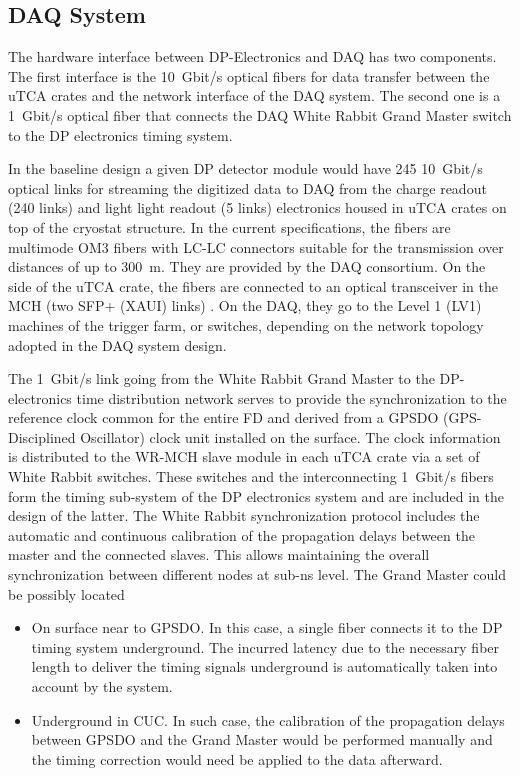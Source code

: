 \subsection{DAQ System}
\label{sec:fddp-tpc-elec-intfc-daq}

The hardware interface between DP-Electronics and DAQ has two components. The first interface is the \SI{10}{Gbit/s} optical fibers for data transfer between the uTCA crates and the network interface of the DAQ system. The second one is a \SI{1}{Gbit/s} optical fiber that connects the DAQ White Rabbit Grand Master switch to the DP electronics timing system.   

In the baseline design a given DP detector module would have \num{245} \SI{10}{Gbit/s} optical links for streaming the digitized data to DAQ from the charge readout (\num{240} links) and light light readout (\num{5} links) electronics housed in uTCA crates on top of the cryostat structure.  In the current specifications, the fibers are multimode OM3 fibers \cite{om3fibers} with LC-LC connectors suitable for the transmission over distances of up to \SI{300}{\metre}.  They are provided by the DAQ consortium. On the side of the uTCA crate, the fibers are connected to an optical transceiver in the MCH (two SFP+ (XAUI) links) \cite{natmch}.  On the DAQ, they go to the Level 1 (LV1) machines of the trigger farm, or switches, depending on the network topology adopted in the DAQ system design.

The \SI{1}{Gbit/s} link going from the White Rabbit Grand Master to the DP-electronics time distribution network serves to provide the synchronization to the reference clock common for the entire FD and derived from a GPSDO (GPS-Disciplined Oscillator) clock unit installed on the surface. The clock information is distributed to the WR-MCH slave module in each uTCA crate via a set of White Rabbit switches. These switches and the interconnecting \SI{1}{Gbit/s} fibers form the timing sub-system of the DP electronics system and are included in the design of the latter. The White Rabbit synchronization protocol includes the automatic and continuous calibration of the propagation delays between the master and the connected slaves. This allows maintaining the overall synchronization between different nodes at sub-ns level. The Grand Master could be possibly located 
\begin{itemize}
\item{On surface near to GPSDO. In this case, a single fiber connects it to the DP timing system underground. The incurred latency due to the necessary fiber length to deliver the timing signals underground is automatically taken into account by the system. }
\item{Underground in CUC. In such case, the calibration of the propagation delays between GPSDO and the Grand Master would be performed manually and the timing correction would need be applied to the data afterward.}
\end{itemize} 

